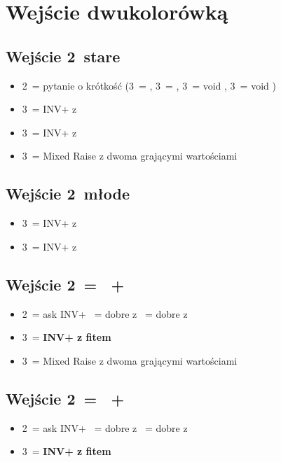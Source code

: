 \documentclass[12pt, a4paper]{article}
\begin{document}
\pagebreak
\section{Wejście dwukolorówką}
\subsection*{Wejście 2\diams\ stare}
\begin{itemize}
    \item 2\nt\ = pytanie o krótkość (3\clubs\ = \clubs, 3\diams\ = \diams, 3\hearts\ = void \clubs, 3\spades\ = void \diams)
    \item 3\clubs\ = INV+ z \hearts
    \item 3\diams\ = INV+ z \spades
    \item 3\major\ = Mixed Raise z dwoma grającymi wartościami
\end{itemize}

\subsection*{Wejście 2\ntx\ młode}
\begin{itemize}
    \item 3\hearts\ = INV+ z \clubs\
    \item 3\spades\ = INV+ z \diams\
\end{itemize}

\subsection*{Wejście 2\hearts\ = \spades\ + \minor}
\begin{itemize}
    \item 2\nt\ = ask INV+
    \hearts\ = dobre z \clubs
    \subitem 3\spades\ = dobre z \diams
    \item 3\diams\ = \textbf{INV+ z fitem} \spades
    \item 3\spades\ = Mixed Raise z dwoma grającymi wartościami
\end{itemize}

\subsection*{Wejście 2\spades\ = \hearts\ + \minor}
\begin{itemize}
    \item 2\nt\ = ask INV+
    \hearts\ = dobre z \clubs 
    \subitem 3\spades\ = dobre z \diams
    \item 3\diams\ = \textbf{INV+ z fitem} \hearts
\end{itemize}  
\end{document}
